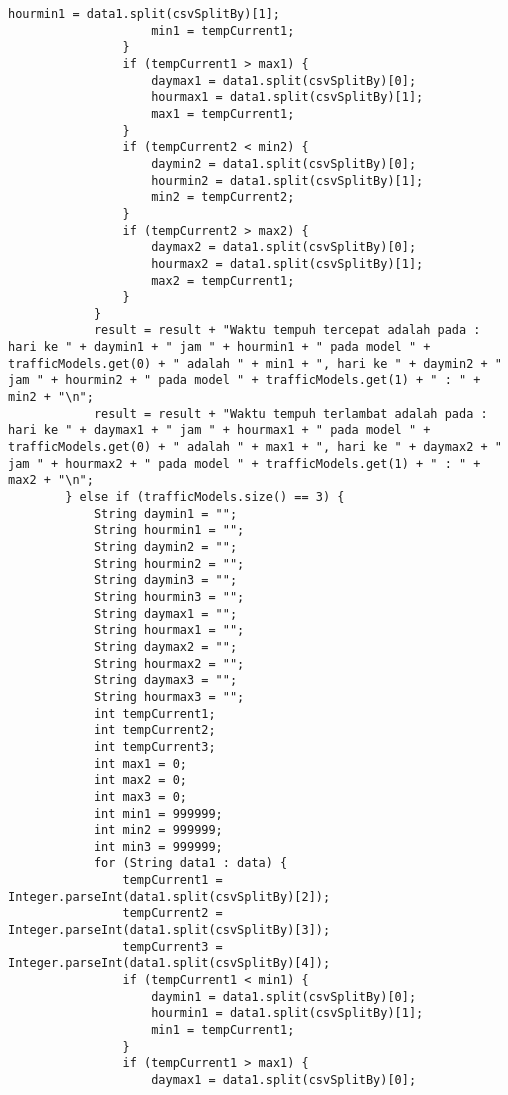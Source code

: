 \begin{lstlisting}[caption= DataProcessor.java]
                    hourmin1 = data1.split(csvSplitBy)[1];
                    min1 = tempCurrent1;
                }
                if (tempCurrent1 > max1) {
                    daymax1 = data1.split(csvSplitBy)[0];
                    hourmax1 = data1.split(csvSplitBy)[1];
                    max1 = tempCurrent1;
                }
                if (tempCurrent2 < min2) {
                    daymin2 = data1.split(csvSplitBy)[0];
                    hourmin2 = data1.split(csvSplitBy)[1];
                    min2 = tempCurrent2;
                }
                if (tempCurrent2 > max2) {
                    daymax2 = data1.split(csvSplitBy)[0];
                    hourmax2 = data1.split(csvSplitBy)[1];
                    max2 = tempCurrent1;
                }
            }
            result = result + "Waktu tempuh tercepat adalah pada : hari ke " + daymin1 + " jam " + hourmin1 + " pada model " + trafficModels.get(0) + " adalah " + min1 + ", hari ke " + daymin2 + " jam " + hourmin2 + " pada model " + trafficModels.get(1) + " : " + min2 + "\n";
            result = result + "Waktu tempuh terlambat adalah pada : hari ke " + daymax1 + " jam " + hourmax1 + " pada model " + trafficModels.get(0) + " adalah " + max1 + ", hari ke " + daymax2 + " jam " + hourmax2 + " pada model " + trafficModels.get(1) + " : " + max2 + "\n";
        } else if (trafficModels.size() == 3) {
            String daymin1 = "";
            String hourmin1 = "";
            String daymin2 = "";
            String hourmin2 = "";
            String daymin3 = "";
            String hourmin3 = "";
            String daymax1 = "";
            String hourmax1 = "";
            String daymax2 = "";
            String hourmax2 = "";
            String daymax3 = "";
            String hourmax3 = "";
            int tempCurrent1;
            int tempCurrent2;
            int tempCurrent3;
            int max1 = 0;
            int max2 = 0;
            int max3 = 0;
            int min1 = 999999;
            int min2 = 999999;
            int min3 = 999999;
            for (String data1 : data) {
                tempCurrent1 = Integer.parseInt(data1.split(csvSplitBy)[2]);
                tempCurrent2 = Integer.parseInt(data1.split(csvSplitBy)[3]);
                tempCurrent3 = Integer.parseInt(data1.split(csvSplitBy)[4]);
                if (tempCurrent1 < min1) {
                    daymin1 = data1.split(csvSplitBy)[0];
                    hourmin1 = data1.split(csvSplitBy)[1];
                    min1 = tempCurrent1;
                }
                if (tempCurrent1 > max1) {
                    daymax1 = data1.split(csvSplitBy)[0];

\end{lstlisting}
